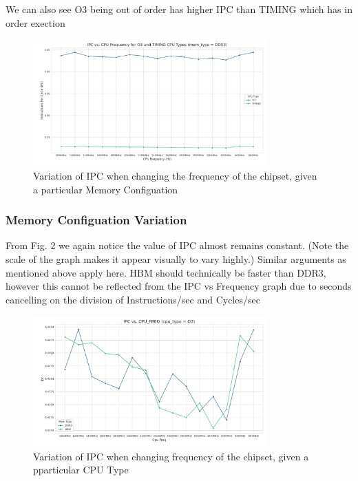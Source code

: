 \documentclass[12pt]{article}
\begin{document}
\noindent We can also see O3 being out of order has higher IPC than TIMING which has in order exection

\begin{figure}[h]
    \centering
    \includegraphics[width=0.8\textwidth]{ipc_vs_feq_line.png}
    \caption{Variation of IPC when changing the frequency of the chipset, given a particular Memory Configuation}
\end{figure}

\subsubsection{Memory Configuation Variation}

From Fig. 2 we again notice the value of IPC almost remains constant. (Note the scale of the graph makes it appear visually to vary highly.)
Similar arguments as mentioned above apply here. HBM should technically be 
faster than DDR3, however this cannot be reflected from the IPC vs Frequency graph due to 
seconds cancelling on the division of Instructions/sec and Cycles/sec
\begin{figure}
    \centering
    \includegraphics[width=0.8\textwidth]{ipc_vs_freq_mem.png}
    \caption{Variation of IPC when changing frequency of the chipset, given a pparticular CPU Type}
\end{figure}
\end{document}
